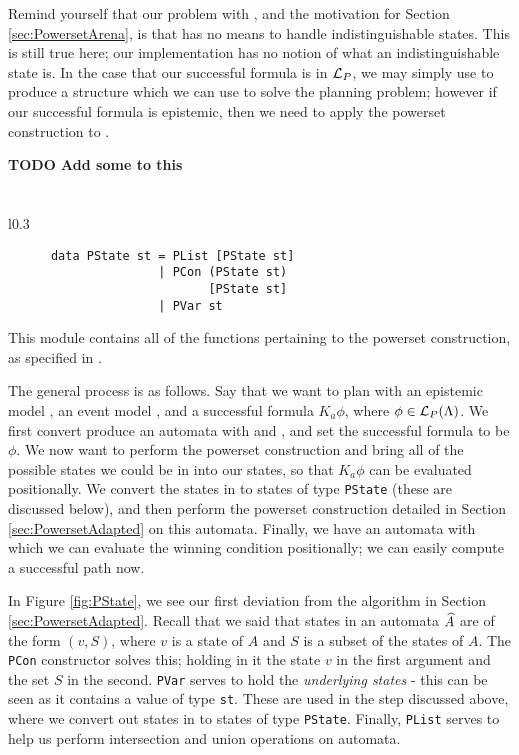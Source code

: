 \documentclass[10pt, a4paper]{report}
\begin{document}
Remind yourself that our problem with \mestar, and the motivation for Section
\ref{sec:PowersetArena}, is that \mestar has no means to handle
indistinguishable states. This is still true here; our implementation has no
notion of what an indistinguishable state is. In the case that our successful
formula is in $\mathcal{L}_P$, we may simply use \mestar to produce a structure which
we can use to solve the planning problem; however if our successful formula is
epistemic, then we need to apply the powerset construction to \mestar. 

\textbf{TODO Add some to this}

\section{}

\begin{wrapfigure}{l}{0.3\textwidth}
  \begin{center}
    \begin{verbatim}
      data PState st = PList [PState st] 
                     | PCon (PState st) 
                            [PState st] 
                     | PVar st 
    \end{verbatim}
  \end{center}
  \caption{The  datatype.}
  \label{fig:PState}
\end{wrapfigure}

This module contains all of the functions pertaining to the powerset
construction, as specified in .

The general process is as follows. Say that we want to plan with an epistemic
model , an event model , and a successful formula $K_a \phi$,
where $\phi \in \mathcal{L}_P(\Lambda)$. We first convert produce an \mestar automata
with  and , and set the successful formula to be $\phi$. We now
want to perform the powerset construction and bring all of the possible states
we could be in into our states, so that $K_a \phi$ can be evaluated
positionally. We convert the states in \mestar to states of type
\texttt{PState} (these are discussed below), and then perform the
powerset construction detailed in Section \ref{sec:PowersetAdapted} on this
automata. Finally, we have an automata with which we can evaluate the winning
condition positionally; we can easily compute a successful path now. 

In Figure \ref{fig:PState}, we see our first deviation from the algorithm in
Section \ref{sec:PowersetAdapted}. Recall that we said that states in an
automata $\widehat{A}$ are of the form $(v, S)$, where $v$ is a state of $A$ and $S$
is a subset of the states of $A$. The \texttt{PCon} constructor
solves this; holding in it the state $v$ in the first argument and the set $S$
in the second. \texttt{PVar} serves to hold the \emph{underlying
  states} - this can be seen as it contains a value of type
\texttt{st}. These are used in the step discussed above, where we
convert out states in \mestar to states of type \texttt{PState}.
Finally, \texttt{PList} serves to help us perform intersection and
union operations on automata.
\end{document}
